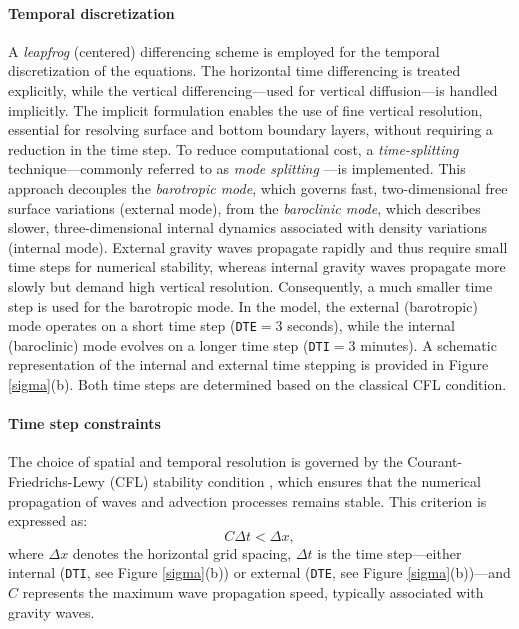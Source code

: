 \documentclass[a4paper,12pt,reqno,natbib]{amsart}
\begin{document}
\vspace{0.2cm}   
\paragraph{\bf{Temporal discretization}}
A \textit{leapfrog} (centered) differencing scheme is employed for the temporal discretization of the equations. The horizontal time differencing is treated explicitly, while the vertical differencing---used for vertical diffusion---is handled implicitly. The implicit formulation enables the use of fine vertical resolution, essential for resolving surface and bottom boundary layers, without requiring a reduction in the time step. To reduce computational cost, a \textit{time-splitting} technique---commonly referred to as \textit{mode splitting} \cite{simons,madala}---is implemented. This approach decouples the \textit{barotropic mode}, which governs fast, two-dimensional free surface variations (external mode), from the \textit{baroclinic mode}, which describes slower, three-dimensional internal dynamics associated with density variations (internal mode). External gravity waves propagate rapidly and thus require small time steps for numerical stability, whereas internal gravity waves propagate more slowly but demand high vertical resolution. Consequently, a much smaller time step is used for the barotropic mode. In the model, the external (barotropic) mode operates on a short time step (\texttt{DTE}$= 3$ seconds), while the internal (baroclinic) mode evolves on a longer time step (\texttt{DTI}$= 3$ minutes). A schematic representation of the internal and external time stepping is provided in Figure \ref{sigma}(b). Both time steps are determined based on the classical CFL condition.



\vspace{0.3cm}   
\paragraph{\bf{Time step constraints}} The choice of spatial and temporal resolution is governed by the Courant-Friedrichs-Lewy (CFL) stability condition \cite{guide}, which ensures that the numerical propagation of waves and advection processes remains stable. This criterion is expressed as:
\[
C \Delta t < \Delta x,
\]
where \( \Delta x \) denotes the horizontal grid spacing, \( \Delta t \) is the time step---either internal (\texttt{DTI}, see Figure \ref{sigma}(b)) or external (\texttt{DTE}, see Figure \ref{sigma}(b))---and \( C \) represents the maximum wave propagation speed, typically associated with gravity waves.
\end{document}
